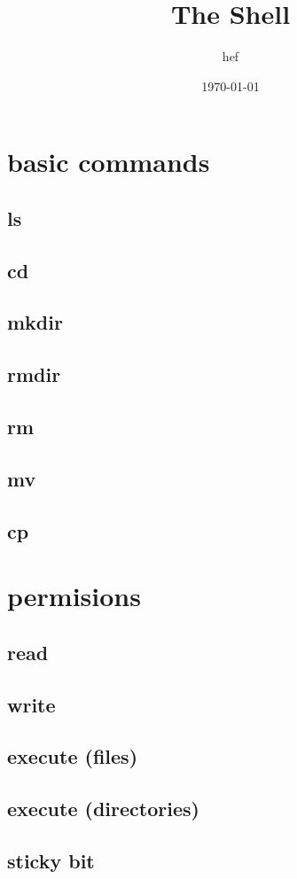 \documentclass[hyperref={pdfpagelabels=false}]{beamer}
\title{The Shell}
\author{hef}
\date{\today}
\begin{document}
\frame{\titlepage}
\section[outline]{}
\frame{\tableofcontents}
\section{basic commands}
\subsection{ls}
\subsection{cd}
\subsection{mkdir}
\subsection{rmdir}
\subsection{rm}
\subsection{mv}
\subsection{cp}
\section{permisions}
\subsection{read}
\subsection{write}
\subsection{execute (files)}
\subsection{execute (directories)}
\subsection{sticky bit}
\end{document}
